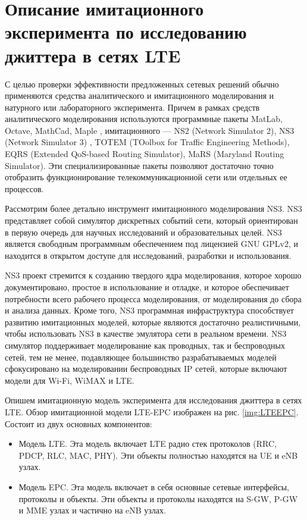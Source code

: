 \section{Описание имитационного эксперимента по исследованию джиттера в сетях LTE}

С целью проверки эффективности предложенных сетевых решений обычно применяются средства аналитического и имитационного моделирования и натурного или лабораторного эксперимента.
Причем в рамках средств аналитического моделирования используются программные пакеты MatLab, Octave, MathCad, Maple \cite{matlab,octave,mathcad,maple}, 
имитационного --- NS2 (Network Simulator 2), NS3 (Network Simulator 3) \cite{ns3}, TOTEM (TOolbox for Traffic Engineering Methods), 
EQRS (Extended QoS-based Routing Simulator), MaRS (Maryland Routing Simulator).
Эти специализированные пакеты позволяют достаточно точно отобразить функционирование телекоммуникационной сети или отдельных ее процессов.

Рассмотрим более детально инструмент имитационного моделирования NS3.
NS3 представляет собой симулятор дискретных событий сети, который ориентирован в первую очередь для научных исследований и образовательных целей. 
NS3 является свободным программным обеспечением под лицензией GNU GPLv2, и находится в открытом доступе для исследований, разработки и использования.

NS3 проект стремится к созданию твердого ядра ​​моделирования, которое хорошо документировано, простое в использование и отладке, и которое обеспечивает потребности всего рабочего процесса моделирования, от моделирования до сбора и анализа данных.
Кроме того, NS3 программная инфраструктура способствует развитию имитационных моделей, которые являются достаточно реалистичными, чтобы использовать NS3 в качестве эмулятора сети в реальном времени.
NS3 симулятор поддерживает моделирование как проводных, так и беспроводных сетей, тем не менее, подавляющее большинство разрабатываемых моделей сфокусировано на моделировании беспроводных IP сетей, которые включают модели для Wi-Fi, WiMAX и LTE.


Опишем имитационную модель эксперимента для исследования джиттера в сетях LTE.
Обзор имитационной модели LTE-EPC изображен на рис. \ref{img:LTEEPC}. Состоит из двух основных компонентов:
\begin{itemize}
  \item Модель LTE. Эта модель включает LTE радио стек протоколов (RRC, PDCP, RLC, MAC, PHY). Эти объекты полностью находятся на UE и eNB узлах.
  \item Модель EPC. Эта модель включает в себя основные сетевые интерфейсы, протоколы и объекты. Эти объекты и протоколы находятся на S-GW, P-GW и MME узлах и частично на eNB узлах.
\end{itemize}

